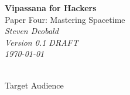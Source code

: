 \documentclass{article}
\begin{document}
\begin{titlepage}
   \begin{center}
     \Huge\textbf{Vipassana for Hackers}\\
     \Huge{Paper Four: Mastering Spacetime}\\
     \vspace{5cm}
     \large\textit{Steven Deobald}\\
     \large\textit{Version 0.1 DRAFT}\\
     \large\textit\today\\
     \vspace{5cm}
     \large\textit{}\\
   \end{center}
\end{titlepage}

\begin{center}
  \Huge{Target Audience}
\end{center}
\end{document}
